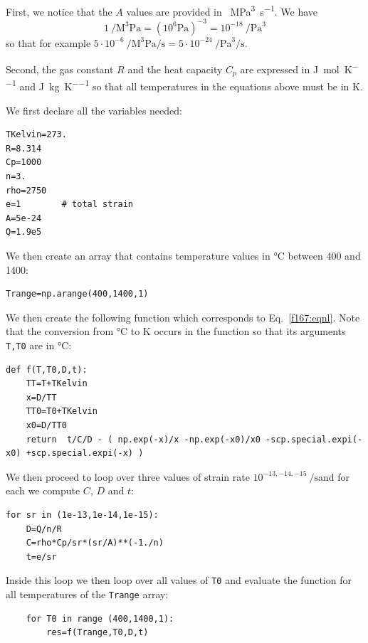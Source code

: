 First, we notice that the $A$ values are provided in \si{\per\cubic\mega\pascal \per \second}.
We have 
\[
1~\si{\per\cubic\mega\pascal} = (10^6 \si{\pascal})^{-3} = 10^{-18}~\si{\per\cubic\pascal}
\] 
so that for example $5\cdot 10^{-6}~\si{\per\cubic\mega\pascal\per\second} 
= 5 \cdot 10^{-24}~\si{\per\cubic\pascal \per\second}$.

Second, the gas constant $R$ and the heat capacity $C_p$ are expressed in 
\si{\joule\per\mol\per\kelvin} and \si{\joule\per\kg\per\kelvin} so that 
all temperatures in the equations above must be in \si{\kelvin}.

We first declare all the variables needed:

\begin{lstlisting}
TKelvin=273.
R=8.314
Cp=1000
n=3.
rho=2750
e=1        # total strain
A=5e-24
Q=1.9e5
\end{lstlisting}

We then create an array that contains
temperature values in \si{\celsius} between 400 and 1400:

\begin{lstlisting}
Trange=np.arange(400,1400,1)
\end{lstlisting}

We then create the following function which corresponds to Eq.~\eqref{f167:eqnl}.
Note that the conversion from \si{\celsius} to \si{\kelvin} occurs in the function
so that its arguments \lstinline|T,T0| are in \si{\celsius}:
\begin{lstlisting}
def f(T,T0,D,t):
    TT=T+TKelvin
    x=D/TT
    TT0=T0+TKelvin
    x0=D/TT0
    return  t/C/D - ( np.exp(-x)/x -np.exp(-x0)/x0 -scp.special.expi(-x0) +scp.special.expi(-x) ) 
\end{lstlisting}

We then proceed to loop over three values of strain rate $10^{-13,-14,-15}~\si{\per\second}$and 
for each we compute $C$, $D$ and $t$:

\begin{lstlisting}
for sr in (1e-13,1e-14,1e-15):
    D=Q/n/R
    C=rho*Cp/sr*(sr/A)**(-1./n)
    t=e/sr
\end{lstlisting}

Inside this loop we then loop over all values of \lstinline|T0| and 
evaluate the function for all temperatures of the \lstinline|Trange| array:
\begin{lstlisting}
    for T0 in range (400,1400,1):
        res=f(Trange,T0,D,t)
\end{lstlisting}

